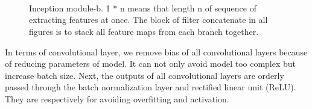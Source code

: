 \begin{figure}[H]
    \centering
    \\
    \centering
    \\
    \centering
    \\
    \captionsetup{labelfont=bf}
    \renewcommand{\baselinestretch}{1.0}
    \caption[Structure of detailed modules]{Inception module-b. 1 * n means that length n of sequence of extracting features at once.  The block of filter concatenate in all figures is to stack all feature maps from each branch together.}
    \label{f9}
\end{figure}

In terms of convolutional layer, we remove bias of all convolutional layers because of reducing parameters of model. It can not only avoid model too complex but increase batch size. Next, the outputs of all convolutional layers are orderly passed through the batch normalization layer and rectified linear unit (ReLU). They are respectively for avoiding overfitting and activation.

